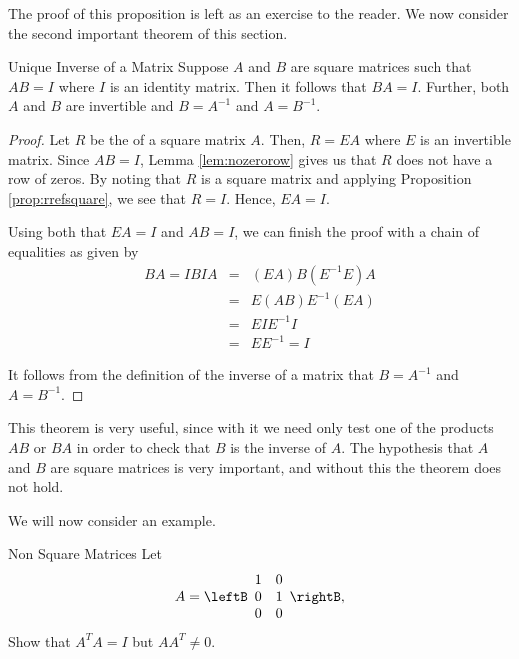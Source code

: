 The proof of this proposition is left as an exercise to the reader. 
We now consider the second important theorem of this section. 

\begin{theorem}{Unique Inverse of a Matrix}\label{thm:uniqueinverseofmatrix}
Suppose $A$ and $B$ are square matrices such that $AB=I$ where $I$ is an identity matrix. Then it follows that $BA=I$. Further, both $A$ and $B$ are invertible and $B=A^{-1}$ and $A=B^{-1}$.
\end{theorem}

\ifdefined\showproofs
\begin{proof}
Let $R$ be the \rref \;of a square matrix $A$. Then, $R=EA$ where $E$ is an invertible matrix. Since $AB=I$, Lemma \ref{lem:nozerorow} gives us that $R$ does not have a row of zeros. By noting that $R$ is a square matrix and applying Proposition \ref{prop:rrefsquare}, we see that $R=I$. Hence, $EA=I$. 

Using both that $EA=I$ and $AB=I$, we can finish the proof with a chain of equalities as given by
\begin{eqnarray*}
BA = IBIA &=& (EA)B(E^{-1}E)A \\
&=& E(AB)E^{-1}(EA) \\
&=& EIE^{-1}I \\
&=& EE^{-1} = I
\end{eqnarray*}

It follows from the definition of the inverse of a matrix that $B=A^{-1}$ and $A=B^{-1}$.
\end{proof}
\fi

This theorem is very useful, since with it we need only test one of the products $AB$ or $BA$ in order to check that $B$ is the inverse of $A$. The hypothesis that $A$ and $B$ are square matrices is very important, and without this the theorem does not hold.

We will now consider an example.

\begin{example}{Non Square Matrices}\label{exa:nonsquare}
Let 
\begin{equation*}
A =
\leftB
\begin{array}{rr}
1 & 0 \\
0 & 1 \\
0 & 0 
\end{array}
\rightB,
\end{equation*}
Show that $A^{T}A = I$ but $AA^{T} \neq 0$. 
\end{example}

